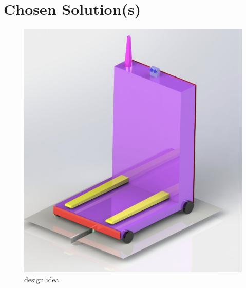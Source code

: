 \documentclass[12pt]{article}
\begin{document}
 
\section{Chosen Solution(s)}


\begin{figure}[h!]
    \centering
     \includegraphics[width=1\textwidth]{anna&will's design.png}
        \caption{design idea}
         \label{fig:design ide}
\end{figure}
\end{document}
